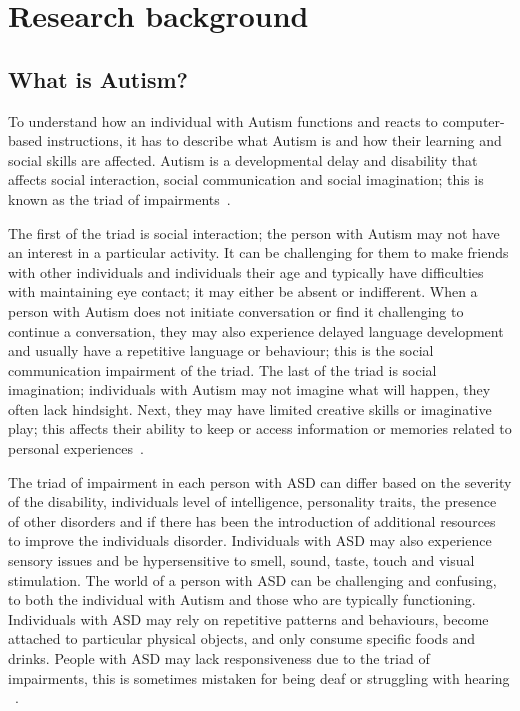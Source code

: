 \chapter{Research background}
\label{chap:Research background}

\section{What is Autism?} 

To understand how an individual with Autism functions and reacts to computer-based instructions, it has to describe what Autism is and how their learning and social skills are affected. Autism is a developmental delay and disability that affects social interaction, social communication and social imagination; this is known as the triad of impairments~\cite{Reference6}. 

The first of the triad is social interaction; the person with Autism may not have an interest in a particular activity. It can be challenging for them to make friends with other individuals and individuals their age and typically have difficulties with maintaining eye contact; it may either be absent or indifferent. When a person with Autism does not initiate conversation or find it challenging to continue a conversation, they may also experience delayed language development and usually have a repetitive language or behaviour; this is the social communication impairment of the triad. The last of the triad is social imagination; individuals with Autism may not imagine what will happen, they often lack hindsight. Next, they may have limited creative skills or imaginative play; this affects their ability to keep or access information or memories related to personal experiences~\cite{Reference7}.

The triad of impairment in each person with ASD can differ based on the severity of the disability, individuals level of intelligence, personality traits, the presence of other disorders and if there has been the introduction of additional resources to improve the individuals disorder. Individuals with ASD may also experience sensory issues and be hypersensitive to smell, sound, taste, touch and visual stimulation. The world of a person with ASD can be challenging and confusing, to both the individual with Autism and those who are typically functioning. Individuals with ASD may rely on repetitive patterns and behaviours, become attached to particular physical objects, and only consume specific foods and drinks. People with ASD may lack responsiveness due to the triad of impairments, this is sometimes mistaken for being deaf or struggling with hearing ~\cite{Reference8}.

